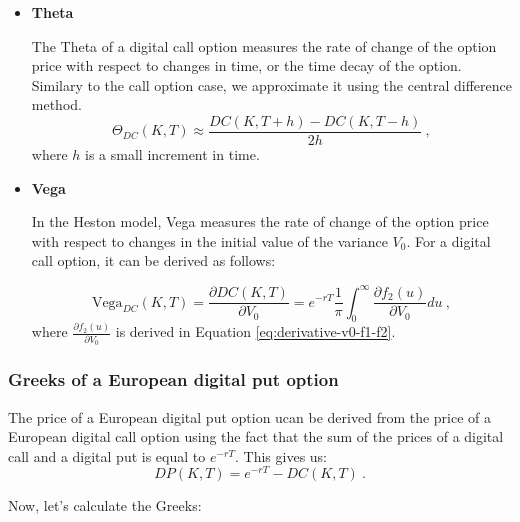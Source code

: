 \begin{itemize}
\item \textbf{Theta} 

The Theta of a digital call option measures the rate of change of the option price with respect to changes in time, or the time decay of the option. Similary to the call option case, we approximate it using the central difference method. 
$$
 \Theta_{DC}(K,T) \approx \frac{DC(K,T+h) - DC(K,T-h)}{2h} \  ,
$$
where $h$ is a small increment in time. 


\item \textbf{Vega} 

In the Heston model, Vega measures the rate of change of the option price with respect to changes in the initial value of the variance $V_0$. For a digital call option, it can be derived as follows:

$$
\text{Vega}_{DC}(K,T) = \frac{\partial DC(K,T)}{\partial V_0} = e^{-r T}   \frac{1}{\pi}\int_0^{\infty}\frac{\partial f_2(u)}{\partial V_0} du \ ,
$$
where $\frac{\partial f_2(u)}{\partial V_0}$ is derived in Equation \ref{eq:derivative-v0-f1-f2}.


\end{itemize}













\subsubsection{Greeks of a European digital put option}

The price of a European digital put option ucan be derived from the price of a European digital call option using the fact that the sum of the prices of a digital call and a digital put is equal to $e^{-rT}$. This gives us:
$$
DP(K,T) = e^{-rT} - DC(K,T) \ .
$$

Now, let's calculate the Greeks:

